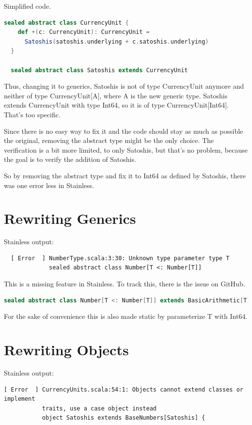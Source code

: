Simplified code.
\begin{lstlisting}[language=scala]
  sealed abstract class CurrencyUnit {
    def +(c: CurrencyUnit): CurrencyUnit =
      Satoshis(satoshis.underlying + c.satoshis.underlying)
  }

  sealed abstract class Satoshis extends CurrencyUnit
\end{lstlisting}

Thus, changing it to generics, Satoshis is not of type CurrencyUnit anymore and neither of type CurrencyUnit[A], where A is the new generic type.
Satoshis extends CurrencyUnit with type Int64, so it is of type CurrencyUnit[Int64].
That's too specific.

Since there is no easy way to fix it and the code should stay as much as possible the original, removing the abstract type might be the only choice.
The verification is a bit more limited, to only Satoshis, but that's no problem, because the goal is to verify the addition of Satoshis.

So by removing the abstract type and fix it to Int64 as defined by Satoshis, there was one error less in Stainless.


\section{Rewriting Generics}
Stainless output:
\begin{verbatim}
  [ Error  ] NumberType.scala:3:30: Unknown type parameter type T
             sealed abstract class Number[T <: Number[T]]
\end{verbatim}

This is a missing feature in Stainless.
To track this, there is the issue  on GitHub.
\begin{lstlisting}[language=scala]
  sealed abstract class Number[T <: Number[T]] extends BasicArithmetic[T]  
\end{lstlisting}
For the sake of convenience this is also made static by parameterize T with Int64.


\section{Rewriting Objects}
Stainless output:
\begin{verbatim}
[ Error  ] CurrencyUnits.scala:54:1: Objects cannot extend classes or implement
           traits, use a case object instead
           object Satoshis extends BaseNumbers[Satoshis] {
\end{verbatim}

